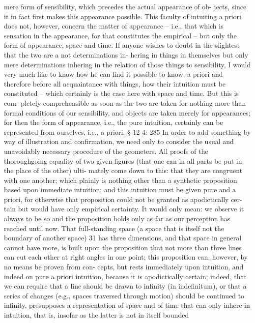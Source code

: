 mere form of sensibility, which precedes the actual appearance of ob-
jects, since it in fact ﬁrst makes this appearance possible. This faculty of
intuiting a priori does not, however, concern the matter of appearance –
i.e., that which is sensation in the appearance, for that constitutes the
empirical – but only the form of appearance, space and time. If anyone
wishes to doubt in the slightest that the two are a not determinations in-
hering in things in themselves but only mere determinations inhering
in the relation of those things to sensibility, I would very much like to
know how he can ﬁnd it possible to know, a priori and therefore before
all acquaintance with things, how their intuition must be constituted –
which certainly is the case here with space and time. But this is com-
pletely comprehensible as soon as the two are taken for nothing more
than formal conditions of our sensibility, and objects are taken merely
for appearances; for then the form of appearance, i.e., the pure intuition,
certainly can be represented from ourselves, i.e., a priori.
§ 12
4: 285
In order to add something by way of illustration and conﬁrmation, we
need only to consider the usual and unavoidably necessary procedure of
the geometers. All proofs of the thoroughgoing equality of two given
ﬁgures (that one can in all parts be put in the place of the other) ulti-
mately come down to this: that they are congruent with one another;
which plainly is nothing other than a synthetic proposition based upon
immediate intuition; and this intuition must be given pure and a priori,
for otherwise that proposition could not be granted as apodictically cer-
tain but would have only empirical certainty. It would only mean: we
observe it always to be so and the proposition holds only as far as our
perception has reached until now. That full-standing space (a space that
is itself not the boundary of another space) 31 has three dimensions, and
that space in general cannot have more, is built upon the proposition
that not more than three lines can cut each other at right angles in one
point; this proposition can, however, by no means be proven from con-
cepts, but rests immediately upon intuition, and indeed on pure a priori
intuition, because it is apodictically certain; indeed, that we can require
that a line should be drawn to inﬁnity (in indeﬁnitum), or that a series of
changes (e.g., spaces traversed through motion) should be continued to
inﬁnity, presupposes a representation of space and of time that can only
inhere in intuition, that is, insofar as the latter is not in itself bounded
